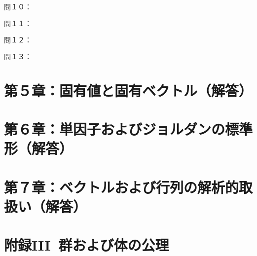 \documentclass[dvipdfmx,uplatex,11pt]{jsarticle}
\theoremstyle{definition}
\begin{document}
%
%
%
\newpage
%
%
%
\noindent
問１０：




















%
%
%
\newpage
%
%
%
\noindent
問１１：





















%
%
%
\newpage
%
%
%
\noindent
問１２：

















%
%
%
\newpage
%
%
%
問１３：














%
%
%
\newpage
%
%
%
\section{第５章：固有値と固有ベクトル（解答）}
%
%
%
\newpage
%
%
%
\section{第６章：単因子およびジョルダンの標準形（解答）}
%
%
%
\newpage
%
%
%
\section{第７章：ベクトルおよび行列の解析的取扱い（解答）}

%
%
%
\newpage
%
%
%
\section{附録III~群および体の公理}
\end{document}
